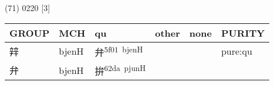 \documentclass[14pt,a4paper]{scrartcl}
\begin{document}
(71) 0220 {[}3{]}

\begin{longtable}[c]{@{}llllll@{}}
\toprule
\begin{minipage}[b]{0.14\columnwidth}\raggedright\strut
GROUP
\strut\end{minipage} &
\begin{minipage}[b]{0.14\columnwidth}\raggedright\strut
MCH
\strut\end{minipage} &
\begin{minipage}[b]{0.14\columnwidth}\raggedright\strut
qu
\strut\end{minipage} &
\begin{minipage}[b]{0.14\columnwidth}\raggedright\strut
other
\strut\end{minipage} &
\begin{minipage}[b]{0.14\columnwidth}\raggedright\strut
none
\strut\end{minipage} &
\begin{minipage}[b]{0.14\columnwidth}\raggedright\strut
PURITY
\strut\end{minipage}\tabularnewline
\midrule
\endhead
\begin{minipage}[t]{0.14\columnwidth}\raggedright\strut
辡
\strut\end{minipage} &
\begin{minipage}[t]{0.14\columnwidth}\raggedright\strut
bjenH
\strut\end{minipage} &
\begin{minipage}[t]{0.14\columnwidth}\raggedright\strut
弁\textsuperscript{5f01~bjenH}
\strut\end{minipage} &
\begin{minipage}[t]{0.14\columnwidth}\raggedright\strut
\strut\end{minipage} &
\begin{minipage}[t]{0.14\columnwidth}\raggedright\strut
\strut\end{minipage} &
\begin{minipage}[t]{0.14\columnwidth}\raggedright\strut
pure:qu
\strut\end{minipage}\tabularnewline
\begin{minipage}[t]{0.14\columnwidth}\raggedright\strut
弁
\strut\end{minipage} &
\begin{minipage}[t]{0.14\columnwidth}\raggedright\strut
bjenH
\strut\end{minipage} &
\begin{minipage}[t]{0.14\columnwidth}\raggedright\strut
拚\textsuperscript{62da~pjunH}

\end{minipage}
\end{longtable}
\end{document}
